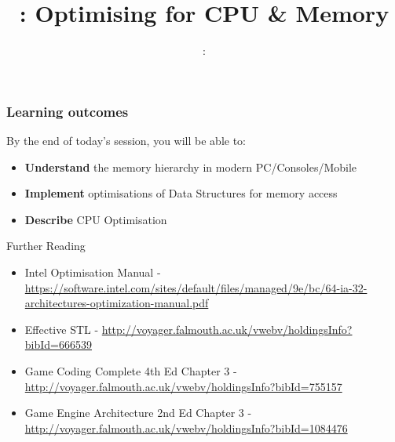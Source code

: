 \usepackage{../../beamerthemeFalmouthGamesAcademy}
\usepackage{multimedia}
\graphicspath{ {../../} }


\usepackage[normalem]{ulem}
\usepackage{wasysym}

\usepackage{pdfpages}

\usetikzlibrary{arrows,automata}




\title{\sessionnumber: Optimising for CPU \& Memory}
\subtitle{\modulecode: \moduletitle}

\frame{\titlepage} 

\begin{frame}
	\frametitle{Learning outcomes}
	By the end of today's session, you will be able to:
	\begin{itemize}
		\item \textbf{Understand} the memory hierarchy in modern PC/Consoles/Mobile
		\item \textbf{Implement} optimisations of Data Structures for memory access
		\item \textbf{Describe} CPU Optimisation
	\end{itemize}
\end{frame}






%

\begin{frame}{Further Reading}
	\begin{itemize}
		\item Intel Optimisation Manual -  \url{https://software.intel.com/sites/default/files/managed/9e/bc/64-ia-32-architectures-optimization-manual.pdf}
		\item Effective STL - \url{http://voyager.falmouth.ac.uk/vwebv/holdingsInfo?bibId=666539}
		\item Game Coding Complete 4th Ed Chapter 3 - \url{http://voyager.falmouth.ac.uk/vwebv/holdingsInfo?bibId=755157}
		\item Game Engine Architecture 2nd Ed  Chapter 3 - \url{http://voyager.falmouth.ac.uk/vwebv/holdingsInfo?bibId=1084476}
	\end{itemize}
\end{frame}


